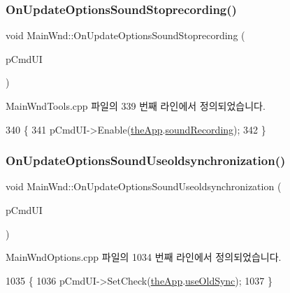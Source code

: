 \subsubsection{\texorpdfstring{On\+Update\+Options\+Sound\+Stoprecording()}{OnUpdateOptionsSoundStoprecording()}}
{\footnotesize\ttfamily void Main\+Wnd\+::\+On\+Update\+Options\+Sound\+Stoprecording (\begin{DoxyParamCaption}\item[{C\+Cmd\+UI $\ast$}]{p\+Cmd\+UI }\end{DoxyParamCaption})\hspace{0.3cm}{\ttfamily [protected]}}



Main\+Wnd\+Tools.\+cpp 파일의 339 번째 라인에서 정의되었습니다.


\begin{DoxyCode}
340 \{
341   pCmdUI->Enable(\mbox{\hyperlink{_v_b_a_8cpp_a8095a9d06b37a7efe3723f3218ad8fb3}{theApp}}.\mbox{\hyperlink{class_v_b_a_ae4be99a1a898dc5a3fceed0edeb0c1b0}{soundRecording}});
342 \}
\end{DoxyCode}
\mbox{\label{class_main_wnd_ad409c739ea2f37ff73e079067d75d2e5}} 
\subsubsection{\texorpdfstring{On\+Update\+Options\+Sound\+Useoldsynchronization()}{OnUpdateOptionsSoundUseoldsynchronization()}}
{\footnotesize\ttfamily void Main\+Wnd\+::\+On\+Update\+Options\+Sound\+Useoldsynchronization (\begin{DoxyParamCaption}\item[{C\+Cmd\+UI $\ast$}]{p\+Cmd\+UI }\end{DoxyParamCaption})\hspace{0.3cm}{\ttfamily [protected]}}



Main\+Wnd\+Options.\+cpp 파일의 1034 번째 라인에서 정의되었습니다.


\begin{DoxyCode}
1035 \{
1036   pCmdUI->SetCheck(\mbox{\hyperlink{_v_b_a_8cpp_a8095a9d06b37a7efe3723f3218ad8fb3}{theApp}}.\mbox{\hyperlink{class_v_b_a_a8a4b36a4e6259df18baf03360aacad4b}{useOldSync}});
1037 \}
\end{DoxyCode}
\mbox{\label{class_main_wnd_a552ffff0119f7cb71c14eb321cec4a4f}} 
